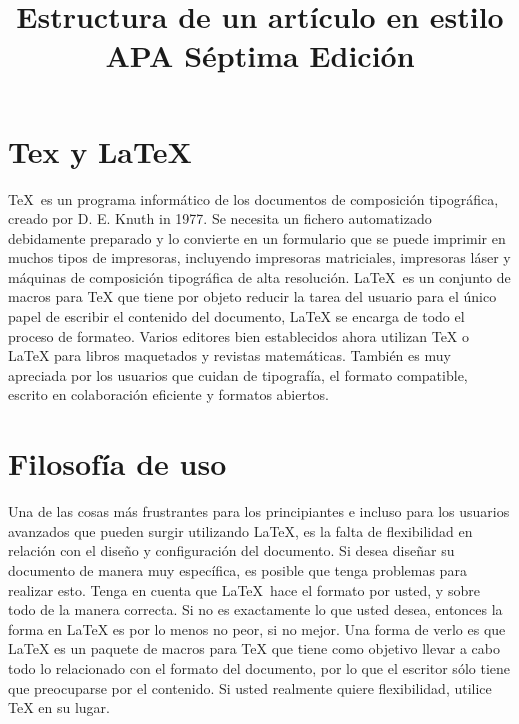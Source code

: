 \documentclass[12pt,letterpaper,jou]{apa7} %
\title{Estructura de un artículo en estilo APA Séptima Edición}
\begin{document}


\maketitle

\section{Tex y LaTeX} %
	
\TeX\ es un programa informático de los documentos de composición tipográfica, creado por D. E. Knuth in 1977. Se necesita un fichero automatizado debidamente preparado y lo convierte en un formulario que se puede imprimir en muchos tipos de impresoras, incluyendo impresoras matriciales, impresoras láser y máquinas de composición tipográfica de alta resolución. \LaTeX\ es un conjunto de macros para TeX que tiene por objeto reducir la tarea del usuario para el único papel de escribir el contenido del documento, LaTeX se encarga de todo el proceso de formateo. Varios editores bien establecidos ahora utilizan TeX o LaTeX para libros maquetados y revistas matemáticas. También es muy apreciada por los usuarios que cuidan de tipografía, el formato compatible, escrito en colaboración eficiente y formatos abiertos. 
	
\section{Filosofía de uso} %
	
Una de las cosas más frustrantes para los principiantes e incluso para los usuarios avanzados que pueden surgir utilizando LaTeX, es la falta de flexibilidad en relación con el diseño y configuración del documento. Si desea diseñar su documento de manera muy específica, es posible que tenga problemas para realizar esto. Tenga en cuenta que LaTeX\ hace el formato por usted, y sobre todo de la manera correcta. Si no es exactamente lo que usted desea, entonces la forma en LaTeX es por lo menos no peor, si no mejor. Una forma de verlo es que LaTeX es un paquete de macros para TeX que tiene como objetivo llevar a cabo todo lo relacionado con el formato del documento, por lo que el escritor sólo tiene que preocuparse por el contenido. Si usted realmente quiere flexibilidad, utilice TeX en su lugar.
\end{document}
